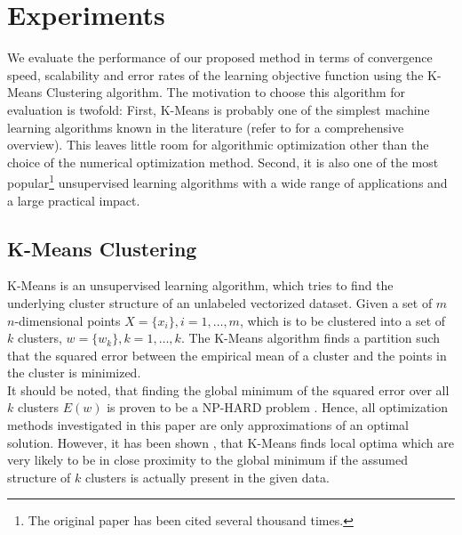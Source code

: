 \documentclass{acm_proc_article-sp}
\begin{document}
\section{Experiments} \label{sec_eval}
We evaluate the performance of our proposed method in terms of convergence speed, 
scalability and error rates of the learning objective function using the 
K-Means Clustering algorithm. The motivation to choose this algorithm for
evaluation is twofold: First, K-Means is probably one of the simplest machine
learning algorithms known in the literature (refer to \cite{jain2010data} for a 
comprehensive overview). This leaves little room for algorithmic optimization 
other than the choice of the numerical optimization method. Second, it is also
one of the most popular\footnote{The original paper \cite{lloyd1982least} has been
cited several thousand times.} unsupervised learning algorithms with a wide 
range of applications and a large practical impact.        

\subsection{K-Means Clustering}
K-Means is an unsupervised learning algorithm, which tries to find the
underlying cluster structure of an unlabeled vectorized dataset.
Given a set of $m$ $n$-dimensional points $X=\{x_i\},i=1,\dots,m$, which is to
be clustered into a set of $k$ clusters, $w=\{w_k\},k=1,\dots,k$. The K-Means
algorithm finds a partition such that the squared error between the
empirical mean of a cluster and the points in the cluster is minimized.\\
It should be noted, that finding the global minimum of the squared error
over all $k$ clusters $E(w)$ is proven to be 
a NP-HARD problem \cite{jain2010data}. Hence, all optimization methods 
investigated in this paper are only approximations of an optimal solution.   
However, it has been shown \cite{Meila}, that K-Means finds local optima 
which are very likely to be in close proximity to the global minimum if the 
assumed structure of $k$ clusters is actually present in the given data.  
\end{document}
